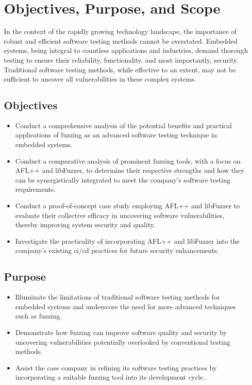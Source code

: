 \section{Objectives, Purpose, and Scope}

In the context of the rapidly growing technology landscape, the importance of
robust and efficient software testing methods cannot be overstated.
Embedded systems, being integral to countless applications and industries,
demand thorough testing to ensure their reliability, functionality, and most
importantly, security. Traditional software testing methods, while effective to
an extent, may not be sufficient to uncover all vulnerabilities in these
complex systems.

\subsection{Objectives}
\begin{itemize}
    \item Conduct a comprehensive analysis of the potential benefits and practical
          applications of fuzzing as an advanced software testing technique in embedded systems.
    \item Conduct a comparative analysis of prominent fuzzing tools, with a
          focus on AFL++ and libFuzzer, to determine their respective strengths and
          how they can be synergistically integrated to meet the company's software
          testing requirements.
    \item Conduct a proof-of-concept case study employing AFL++ and libFuzzer to
          evaluate their collective efficacy in uncovering software vulnerabilities,
          thereby improving system security and quality.
    \item Investigate the practicality of incorporating AFL++ and libFuzzer
          into the company's existing \acrlong{ci/cd} practices for future security enhancements.
\end{itemize}

\subsection{Purpose}
\begin{itemize}
    \item Illuminate the limitations of traditional software testing methods for
          embedded systems and underscore the need for more advanced techniques such as fuzzing.
    \item Demonstrate how fuzzing can improve software quality and security by
          uncovering vulnerabilities potentially overlooked by conventional testing methods.
    \item Assist the case company in refining its software testing practices by
          incorporating a suitable fuzzing tool into its development cycle.
\end{itemize}

